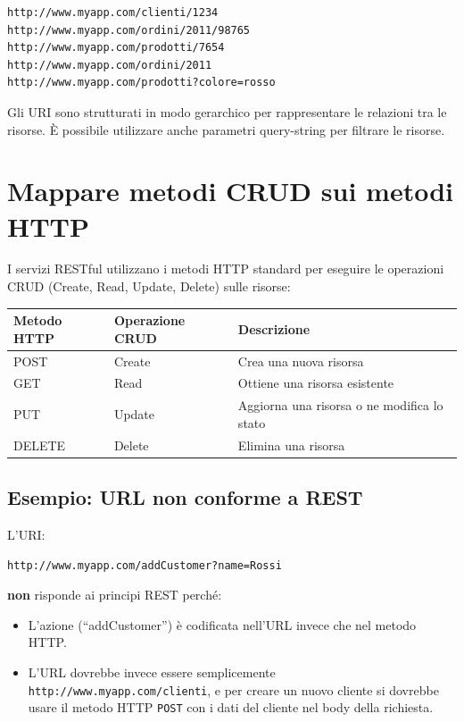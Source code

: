 \begin{verbatim}
http://www.myapp.com/clienti/1234
http://www.myapp.com/ordini/2011/98765
http://www.myapp.com/prodotti/7654
http://www.myapp.com/ordini/2011
http://www.myapp.com/prodotti?colore=rosso
\end{verbatim}

Gli URI sono strutturati in modo gerarchico per rappresentare le relazioni tra le risorse. È possibile utilizzare anche parametri query-string per filtrare le risorse.

\section{Mappare metodi CRUD sui metodi HTTP}

I servizi RESTful utilizzano i metodi HTTP standard per eseguire le operazioni CRUD (Create, Read, Update, Delete) sulle risorse:

\begin{center}
\begin{tabular}{|l|l|l|}
\hline
\textbf{Metodo HTTP} & \textbf{Operazione CRUD} & \textbf{Descrizione} \\
\hline
POST & Create & Crea una nuova risorsa \\
GET & Read & Ottiene una risorsa esistente \\
PUT & Update & Aggiorna una risorsa o ne modifica lo stato \\
DELETE & Delete & Elimina una risorsa \\
\hline
\end{tabular}
\end{center}

\subsection{Esempio: URL non conforme a REST}

L'URI:

\begin{verbatim}
http://www.myapp.com/addCustomer?name=Rossi
\end{verbatim}

\textbf{non} risponde ai principi REST perché:

\begin{itemize}
    \item L'azione (``addCustomer'') è codificata nell'URL invece che nel metodo HTTP.
    \item L'URL dovrebbe invece essere semplicemente \texttt{http://www.myapp.com/clienti}, e per creare un nuovo cliente si dovrebbe usare il metodo HTTP \texttt{POST} con i dati del cliente nel body della richiesta.
\end{itemize}

